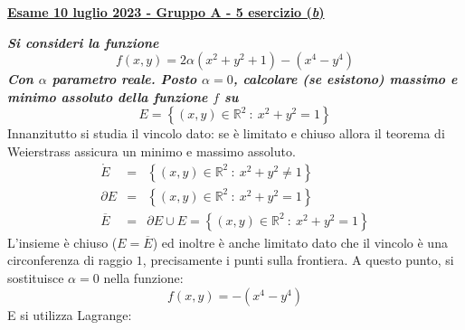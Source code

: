 \documentclass[a4paper]{article}
\newcommand{\definition}[1]{\textcolor{Red3}{\textbf{#1}}}
\newcommand{\example}[1]{\textcolor{Green4}{\textbf{#1}}}
\begin{document}
	\newpage

	\begin{flushleft}
		\label{exam: esame 10 luglio 2023 - Gruppo A - 5 esercizio (b)}
		\hypertarget{
			exam: esame 10 luglio 2023 - Gruppo A - 5 esercizio (b)
		}{
			\definition{\underline{Esame 10 luglio 2023 - Gruppo A - 5 esercizio (\emph{b})}}
		}
	\end{flushleft}
	\example{\emph{Si consideri la funzione}
	\begin{equation*}
		f\left(x,y\right) = 2\alpha\left(x^{2}+y^{2}+1\right)-\left(x^{4}-y^{4}\right)
	\end{equation*}
	\emph{Con $\alpha$ parametro reale. Posto $\alpha = 0$, calcolare (se esistono) massimo e minimo assoluto della funzione $f$ su}
	\begin{equation*}
		E = \left\{\left(x,y\right) \in \mathbb{R}^{2} \: : \: x^{2}+y^{2} = 1\right\}
	\end{equation*}}
	Innanzitutto si studia il vincolo dato: se è limitato e chiuso allora il teorema di Weierstrass assicura un minimo e massimo assoluto.
	\begin{equation*}
		\begin{array}{rcl}
			\mathring{E} &=& \left\{\left(x,y\right) \in \mathbb{R}^{2} \: : \: x^{2} + y^{2} \ne 1\right\} \\ [.3em]
			\partial E &=& \left\{\left(x,y\right) \in \mathbb{R}^{2} \: : \: x^{2} + y^{2} = 1\right\} \\ [.3em]
			\overline{E} &=& \partial E \cup E = \left\{\left(x,y\right) \in \mathbb{R}^{2} \: : \: x^{2} + y^{2} = 1\right\}
		\end{array}
	\end{equation*}
	L'insieme è chiuso ($E = \overline{E}$) ed inoltre è anche limitato dato che il vincolo è una circonferenza di raggio $1$, precisamente i punti sulla frontiera. A questo punto, si sostituisce $\alpha = 0$ nella funzione:
	\begin{equation*}
		f\left(x,y\right) = -\left(x^{4}-y^{4}\right)
	\end{equation*}
	E si utilizza Lagrange:
\end{document}
